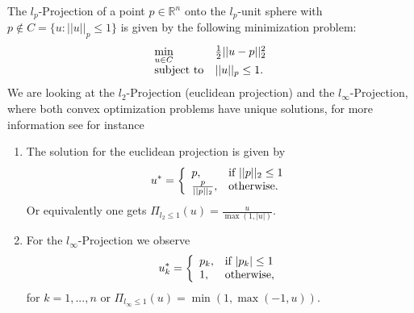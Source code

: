     \begin{example}
    \label{ex:projection_operator}

        The $l_{p}$-Projection of a point $p \in \mathbb{R}^{n}$ onto the $l_{p}$-unit sphere with $p \notin C = \{u : ||u||_{p} \le 1 \}$ is given by the following minimization problem:
            \begin{equation}
                \begin{array}{l l}
                    \min\limits_{u \in C} &  \frac{1}{2} ||u - p||_{2}^{2} \\
                    \textnormal{subject to} & ||u||_{p} \le 1.
                \end{array}
            \end{equation}
        We are looking at the $l_{2}$-Projection (euclidean projection) and the $l_{\infty}$-Projection, where both convex optimization problems have unique solutions, for more information see for instance %
        \begin{enumerate}
            \item The solution for the euclidean projection is given by
                \begin{equation}
                    u^{\ast} =
                    \left\{
                        \begin{array}{l l}
                           p, & \textnormal{if}\,\, ||p||_{2} \le 1 \\
                           \frac{p}{||p||_{2}}, & \textnormal{otherwise.}
                        \end{array}
                    \right.
                \end{equation}
            Or equivalently one gets $\Pi_{l_{2} \le 1}(u) = \frac{u}{\max(1, |u|)}$.
            \item For the $l_{\infty}$-Projection we observe
                \begin{equation}
                    u_{k}^{\ast} =
                    \left\{
                        \begin{array}{l l}
                           p_{k}, & \textnormal{if}\,\, |p_{k}| \le 1 \\
                           1, & \textnormal{otherwise,}
                        \end{array}
                    \right.
                \end{equation}
            for $k = 1, ..., n$ or $\Pi_{l_{\infty} \le 1}(u) = \min(1, \max(-1, u))$.
        \end{enumerate}

    \end{example}


